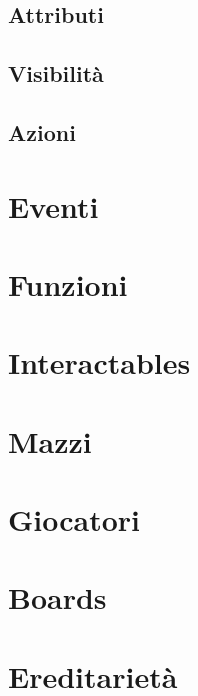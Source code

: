  
\subsection{Attributi}

\subsection{Visibilità}

\subsection{Azioni}

\section{Eventi}

\section{Funzioni}

\section{Interactables}

\section{Mazzi}

\section{Giocatori}

\section{Boards}

\section{Ereditarietà}





